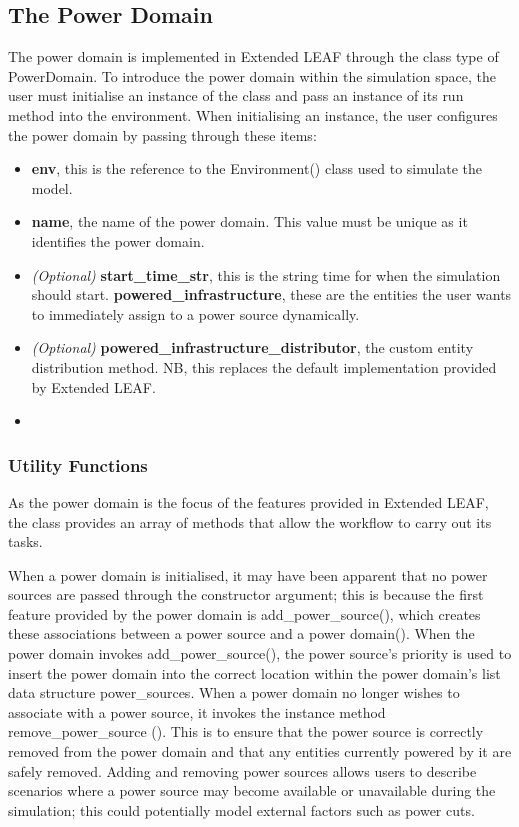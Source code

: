 \documentclass{l4proj}
\begin{document}
\subsection{The Power Domain}\label{sec:power-domain}
The power domain is implemented in Extended LEAF through the class type of PowerDomain.
To introduce the power domain within the simulation space, the user must initialise an instance of the class and pass an instance of its run method into the environment.
When initialising an instance, the user configures the power domain by passing through these items:
\begin{itemize}
    \item \textbf{env}, this is the reference to the Environment() class used to simulate the model.
    \item \textbf{name}, the name of the power domain. This value must be unique as it identifies the power domain.
    \item \textit{(Optional)} \textbf{start\_time\_str}, this is the string time for when the simulation should start. \textbf{powered\_infrastructure}, these are the entities the user wants to immediately assign to a power source dynamically.
    \item \textit{(Optional)} \textbf{powered\_infrastructure\_distributor}, the custom entity distribution method. NB, this replaces the default implementation provided by Extended LEAF.
\item \end{itemize}

\subsubsection{Utility Functions}\label{imp:subsec:utility}
As the power domain is the focus of the features provided in Extended LEAF, the class provides an array of methods that allow the workflow to carry out its tasks.

When a power domain is initialised, it may have been apparent that no power sources are passed through the constructor argument;
this is because the first feature provided by the power domain is add\_power\_source(), which creates these associations between a power source and a power domain().
When the power domain invokes add\_power\_source(), the power source's priority is used to insert the power domain into the correct location within the power domain's list data structure power\_sources.
When a power domain no longer wishes to associate with a power source, it invokes the instance method remove\_power\_source ().
This is to ensure that the power source is correctly removed from the power domain and that any entities currently powered by it are safely removed.
Adding and removing power sources allows users to describe scenarios where a power source may become available or unavailable during the simulation;
this could potentially model external factors such as power cuts.
\end{document}

